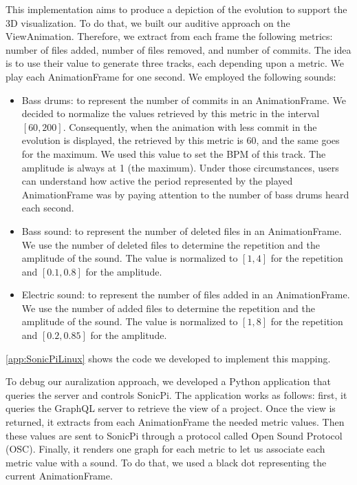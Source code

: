 This implementation aims to produce a depiction of the evolution to support the 3D visualization. To do that, we built our auditive approach on the ViewAnimation. Therefore, we extract from each frame the following metrics: number of files added, number of files removed, and number of commits. The idea is to use their value to generate three tracks, each depending upon a metric. We play each AnimationFrame for one second. We employed the following sounds:
\begin{itemize}
    \item Bass drums: to represent the number of commits in an AnimationFrame. We decided to normalize the values retrieved by this metric in the interval $\left[60,200\right]$. Consequently, when the animation with less commit in the evolution is displayed, the retrieved by this metric is 60, and the same goes for the maximum. We used this value to set the BPM of this track. The amplitude is always at 1 (the maximum). Under those circumstances, users can understand how active the period represented by the played AnimationFrame was by paying attention to the number of bass drums heard each second.
    \item Bass sound: to represent the number of deleted files in an AnimationFrame. We use the number of deleted files to determine the repetition and the amplitude of the sound. The value is normalized to $\left[1,4\right]$ for the repetition and $\left[0.1,0.8\right]$ for the amplitude.
    \item Electric sound: to represent the number of files added in an AnimationFrame.  We use the number of added files to determine the repetition and the amplitude of the sound. The value is normalized to $\left[1,8\right]$ for the repetition and $\left[0.2,0.85\right]$ for the amplitude.
\end{itemize}

\autoref{app:SonicPiLinux} shows the code we developed to implement this mapping. 

To debug our auralization approach, we developed a Python application that queries the server and controls SonicPi. The application works as follows: first, it queries the GraphQL server to retrieve the view of a project. Once the view is returned, it extracts from each AnimationFrame the needed metric values. Then these values are sent to SonicPi through a protocol called Open Sound Protocol (OSC). Finally, it renders one graph for each metric to let us associate each metric value with a sound. To do that, we used a black dot representing the current AnimationFrame. 

